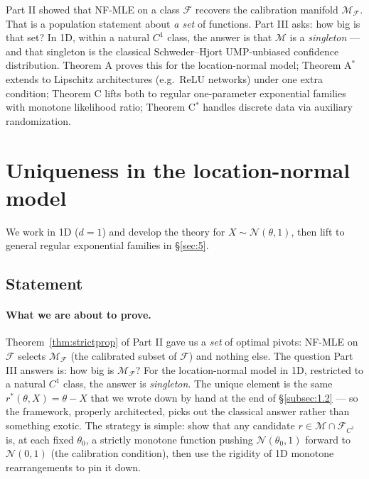 \documentclass[11pt]{article}
\begin{document}
Part II showed that NF-MLE on a class \(\mathcal{F}\) recovers the
calibration manifold \(\mathcal{M}_\mathcal{F}\). That is a population
statement about \emph{a set} of functions. Part III asks: how big is
that set? In 1D, within a natural \(C^1\) class, the answer is that
\(\mathcal{M}\) is a \emph{singleton} --- and that singleton is the
classical Schweder--Hjort UMP-unbiased confidence distribution.
Theorem A proves this for the location-normal model; Theorem A\(^*\)
extends to Lipschitz architectures (e.g.\ ReLU networks) under one
extra condition; Theorem C lifts both to regular one-parameter
exponential families with monotone likelihood ratio; Theorem C\(^*\)
handles discrete data via auxiliary randomization.

\section{Uniqueness in the location-normal model}\label{sec:4}

We work in 1D (\(d = 1\)) and develop the theory for
\(X \sim \mathcal{N}(\theta, 1)\), then lift to general regular
exponential families in \S\ref{sec:5}.

\subsection{Statement}\label{subsec:4.1}

\paragraph{What we are about to prove.}
Theorem~\ref{thm:strictprop} of Part II gave us a \emph{set} of optimal
pivots: NF-MLE on \(\mathcal{F}\) selects \(\mathcal{M}_\mathcal{F}\)
(the calibrated subset of \(\mathcal{F}\)) and nothing else. The
question Part III answers is: how big is \(\mathcal{M}_\mathcal{F}\)?
For the location-normal model in 1D, restricted to a natural \(C^1\)
class, the answer is \emph{singleton}. The unique element is the same
\(r^*(\theta, X) = \theta - X\) that we wrote down by hand at the end
of \S\ref{subsec:1.2} --- so the framework, properly architected, picks
out the classical answer rather than something exotic. The strategy is
simple: show that any candidate \(r \in \mathcal{M} \cap \mathcal{F}_{C^1}\)
is, at each fixed \(\theta_0\), a strictly monotone function pushing
\(\mathcal{N}(\theta_0, 1)\) forward to \(\mathcal{N}(0, 1)\) (the
calibration condition), then use the rigidity of 1D monotone
rearrangements to pin it down.
\end{document}
